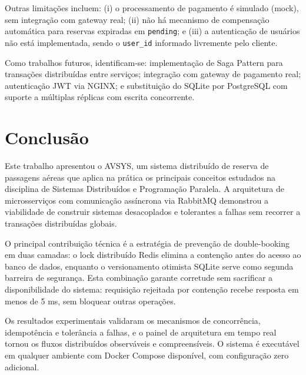 \documentclass[12pt]{article}
\begin{document}
Outras limitações incluem: (i) o processamento de pagamento é simulado (mock), sem
integração com gateway real; (ii) não há mecanismo de compensação automática para
reservas expiradas em \texttt{pending}; e (iii) a autenticação de usuários não está
implementada, sendo o \texttt{user\_id} informado livremente pelo cliente.

Como trabalhos futuros, identificam-se: implementação de Saga Pattern para transações
distribuídas entre serviços; integração com gateway de pagamento real; autenticação JWT
via NGINX; e substituição do SQLite por PostgreSQL com suporte a múltiplas réplicas
com escrita concorrente.


\section{Conclusão}

Este trabalho apresentou o AVSYS, um sistema distribuído de reserva de passagens aéreas
que aplica na prática os principais conceitos estudados na disciplina de Sistemas
Distribuídos e Programação Paralela. A arquitetura de microsserviços com comunicação
assíncrona via RabbitMQ demonstrou a viabilidade de construir sistemas desacoplados e
tolerantes a falhas sem recorrer a transações distribuídas globais.

O principal contribuição técnica é a estratégia de prevenção de double-booking em duas
camadas: o lock distribuído Redis elimina a contenção antes do acesso ao banco de dados,
enquanto o versionamento otimista SQLite serve como segunda barreira de segurança. Esta
combinação garante corretude sem sacrificar a disponibilidade do sistema: requisição
rejeitada por contenção recebe resposta em menos de 5 ms, sem bloquear outras
operações.

Os resultados experimentais validaram os mecanismos de concorrência, idempotência e
tolerância a falhas, e o painel de arquitetura em tempo real tornou os fluxos
distribuídos observáveis e compreensíveis. O sistema é executável em qualquer ambiente
com Docker Compose disponível, com configuração zero adicional.


\end{document}
